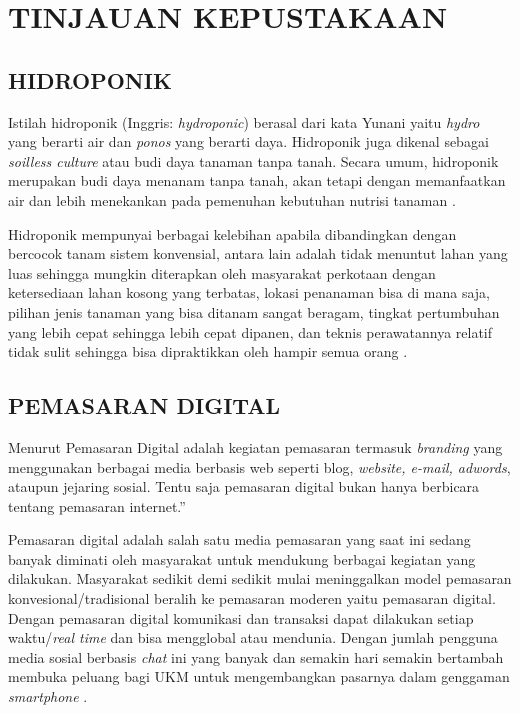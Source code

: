 \fancyhf{} 
\fancyfoot[C]{\thepage}
\chapter{TINJAUAN KEPUSTAKAAN}               

\section{\uppercase{Hidroponik}}
Istilah hidroponik (Inggris: \textit{hydroponic}) berasal dari kata Yunani yaitu \textit{hydro} yang berarti air dan \textit{ponos} yang berarti daya. Hidroponik juga dikenal sebagai \textit{soilless culture} atau budi daya tanaman tanpa tanah. Secara umum, hidroponik merupakan budi daya menanam tanpa tanah, akan tetapi dengan memanfaatkan air dan lebih menekankan pada pemenuhan kebutuhan nutrisi tanaman \citep{alviani2015bertanam}.

\par Hidroponik mempunyai berbagai kelebihan apabila dibandingkan dengan bercocok tanam sistem konvensial, antara lain adalah tidak menuntut lahan yang luas sehingga mungkin diterapkan oleh masyarakat perkotaan dengan ketersediaan lahan kosong yang terbatas, lokasi penanaman bisa di mana saja, pilihan jenis tanaman yang bisa ditanam sangat beragam, tingkat pertumbuhan yang lebih cepat sehingga lebih cepat dipanen, dan teknis perawatannya relatif tidak sulit sehingga bisa dipraktikkan oleh hampir semua orang \citep{iqbal2016simpel}.

\section{\uppercase{Pemasaran Digital}}
Menurut \citep{tarigan2013creative} Pemasaran Digital adalah kegiatan pemasaran termasuk \textit{branding} yang menggunakan berbagai media berbasis web seperti blog, \textit{website, e-mail, adwords}, ataupun jejaring sosial. Tentu saja pemasaran digital bukan hanya berbicara tentang pemasaran internet.”

Pemasaran digital adalah salah satu media pemasaran yang saat ini sedang banyak diminati oleh masyarakat untuk mendukung berbagai kegiatan yang dilakukan. Masyarakat sedikit demi sedikit mulai meninggalkan model pemasaran konvesional/tradisional beralih ke pemasaran moderen yaitu pemasaran digital. Dengan pemasaran digital komunikasi dan transaksi dapat dilakukan setiap waktu/\textit{real time} dan bisa mengglobal atau mendunia. Dengan jumlah pengguna media sosial berbasis \textit{chat} ini yang banyak dan semakin hari semakin bertambah membuka peluang bagi UKM untuk mengembangkan pasarnya dalam genggaman \textit{smartphone} \citep{pradiani2017pengaruh}.

